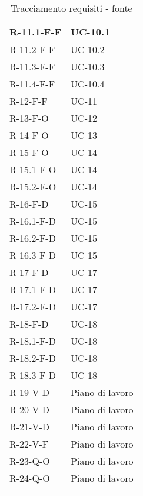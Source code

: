 \begin{longtable}{| C{6cm} |C{6cm}|}
    R-11.1-F-F         & UC-10.1         \\\hline
    R-11.2-F-F         & UC-10.2         \\\hline
    R-11.3-F-F         & UC-10.3         \\\hline
    R-11.4-F-F         & UC-10.4         \\\hline
    R-12-F-F           & UC-11           \\\hline
    R-13-F-O           & UC-12           \\\hline
    R-14-F-O           & UC-13           \\\hline
    R-15-F-O           & UC-14           \\\hline
    R-15.1-F-O         & UC-14           \\\hline
    R-15.2-F-O         & UC-14           \\\hline
    R-16-F-D           & UC-15           \\\hline
    R-16.1-F-D         & UC-15           \\\hline
    R-16.2-F-D         & UC-15           \\\hline
    R-16.3-F-D         & UC-15           \\\hline
    R-17-F-D           & UC-17           \\\hline
    R-17.1-F-D         & UC-17           \\\hline
    R-17.2-F-D         & UC-17           \\\hline
    R-18-F-D           & UC-18           \\\hline
    R-18.1-F-D         & UC-18           \\\hline
    R-18.2-F-D         & UC-18           \\\hline
    R-18.3-F-D         & UC-18           \\\hline
    R-19-V-D            & Piano di lavoro \\\hline
    R-20-V-D            & Piano di lavoro \\\hline
    R-21-V-D            & Piano di lavoro \\\hline
    R-22-V-F            & Piano di lavoro \\\hline
    R-23-Q-O            & Piano di lavoro \\\hline
    R-24-Q-O            & Piano di lavoro \\\hline
    \caption{Tracciamento requisiti - fonte}
\end{longtable}
